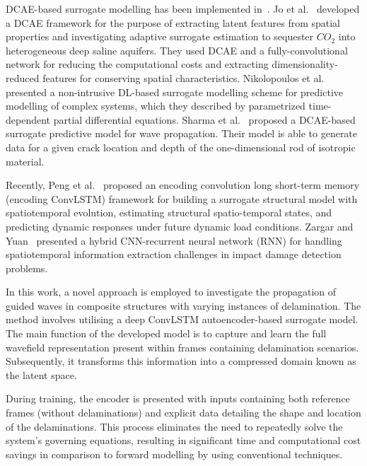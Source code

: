 \documentclass[sn-mathphys-num]{sn-jnl}%
\begin{document}
	DCAE-based surrogate modelling has been implemented 
	in~\cite{jo2021adaptive, nikolopoulos2022non, sharma2022wave}. 
	Jo et al.~\cite{jo2021adaptive} developed a DCAE framework for the purpose 
	of extracting latent features from spatial properties and investigating 
	adaptive surrogate estimation to sequester $CO_2$ into heterogeneous deep 
	saline aquifers. 
	They used DCAE and a fully-convolutional network for reducing the 
	computational costs and extracting dimensionality-reduced features for 
	conserving spatial characteristics. 
	Nikolopoulos et al.~\cite{nikolopoulos2022non} presented a non-intrusive 
	DL-based surrogate modelling scheme for predictive modelling of complex 
	systems, which they described by parametrized time-dependent partial 
	differential equations. 
	Sharma et al.~\cite{sharma2022wave} proposed a DCAE-based surrogate 
	predictive model for wave propagation. 
	Their model is able to generate data for a given crack location and depth 
	of the one-dimensional rod of isotropic material.
	
	Recently, Peng et al.~\cite{peng2021structural} proposed an encoding 
	convolution long short-term memory (encoding ConvLSTM) framework for 
	building a surrogate structural model with spatiotemporal evolution, 
	estimating structural spatio-temporal states, and predicting dynamic 
	responses under future dynamic load conditions. 
	Zargar and Yuan~\cite{zargar2021impact} presented a hybrid CNN-recurrent 
	neural network (RNN) for handling spatiotemporal information extraction 
	challenges in impact damage detection problems.
	
	In this work, a novel approach is employed to investigate the propagation 
	of guided waves in composite structures with varying instances of 
	delamination. 
	The method involves utilising a deep ConvLSTM autoencoder-based surrogate 
	model. 
	The main function of the developed model is to capture and learn the full 
	wavefield representation present within frames containing delamination 
	scenarios. 
	Subsequently, it transforms this information into a compressed domain known 
	as the latent space.
	
	During training, the encoder is presented with inputs containing both 
	reference frames (without delaminations) and explicit data detailing the 
	shape and location of the delaminations. 
	This process eliminates the need to repeatedly solve the system's governing 
	equations, resulting in significant time and computational cost savings in 
	comparison to forward modelling by using conventional techniques.
	
\end{document}
